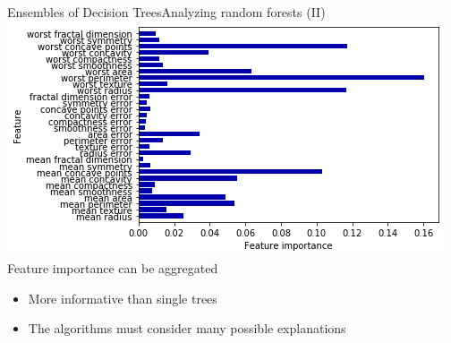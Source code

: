 \documentclass[10pt,compress]{beamer} %
\begin{document}
\begin{frame}{Ensembles of Decision Trees}{Analyzing random forests (II)}
    \centering \includegraphics[width=0.8\linewidth]{figs/forest-importance.png}\\
    \vspace{-0.2cm}
    \flushleft Feature importance can be aggregated
    \begin{itemize}
        \item More informative than single trees
        \item The algorithms must consider many possible explanations
    \end{itemize}
\end{frame}
\end{document}
